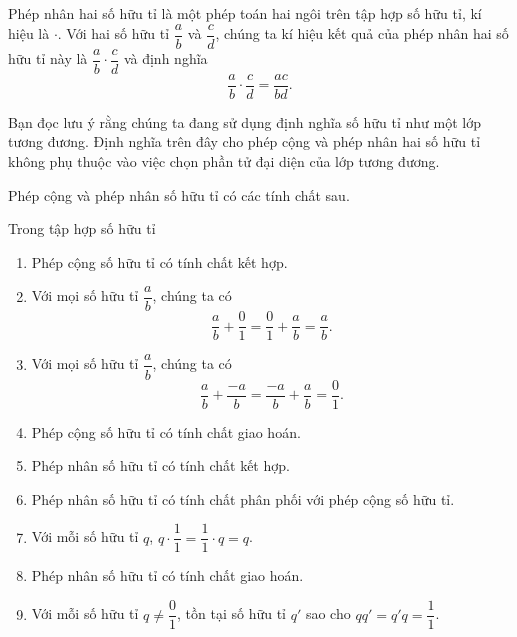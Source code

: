 \begin{definition}
    Phép nhân hai số hữu tỉ là một phép toán hai ngôi trên tập hợp số hữu tỉ, kí hiệu là $\cdot$. Với hai số hữu tỉ $\dfrac{a}{b}$ và $\dfrac{c}{d}$, chúng ta kí hiệu kết quả của phép nhân hai số hữu tỉ này là $\dfrac{a}{b}\cdot\dfrac{c}{d}$ và định nghĩa
    \[
        \frac{a}{b}\cdot\frac{c}{d} = \frac{ac}{bd}.
    \]
\end{definition}

Bạn đọc lưu ý rằng chúng ta đang sử dụng định nghĩa số hữu tỉ như một lớp tương đương. Định nghĩa trên đây cho phép cộng và phép nhân hai số hữu tỉ không phụ thuộc vào việc chọn phần tử đại diện của lớp tương đương.

Phép cộng và phép nhân số hữu tỉ có các tính chất sau.
\begin{theorem}
    Trong tập hợp số hữu tỉ
    \begin{enumerate}[label={(F\arabic*)}]
        \item Phép cộng số hữu tỉ có tính chất kết hợp.
        \item Với mọi số hữu tỉ $\dfrac{a}{b}$, chúng ta có
              \[
                  \frac{a}{b} + \frac{0}{1} = \frac{0}{1} + \frac{a}{b} = \frac{a}{b}.
              \]
        \item Với mọi số hữu tỉ $\dfrac{a}{b}$, chúng ta có
              \[
                  \frac{a}{b} + \frac{-a}{b} = \frac{-a}{b} + \frac{a}{b} = \frac{0}{1}.
              \]
        \item Phép cộng số hữu tỉ có tính chất giao hoán.
        \item Phép nhân số hữu tỉ có tính chất kết hợp.
        \item Phép nhân số hữu tỉ có tính chất phân phối với phép cộng số hữu tỉ.
        \item Với mỗi số hữu tỉ $q$, $q\cdot \dfrac{1}{1} = \dfrac{1}{1}\cdot q = q$.
        \item Phép nhân số hữu tỉ có tính chất giao hoán.
        \item Với mỗi số hữu tỉ $q\ne \dfrac{0}{1}$, tồn tại số hữu tỉ $q'$ sao cho $qq' = q'q = \dfrac{1}{1}$.
    \end{enumerate}
\end{theorem}

